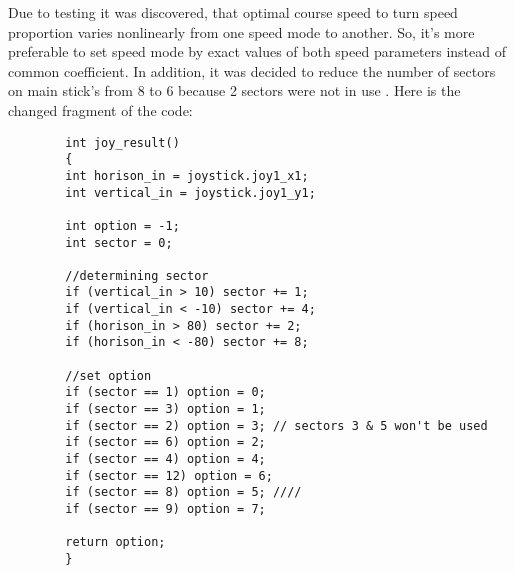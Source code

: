 \begin{enumerate*}
{\begin{verbatim}
	    	\end{verbatim} 
	    }
	    \item Due to testing it was discovered, that optimal course speed to turn speed proportion varies nonlinearly from one speed mode to another. So, it's more preferable to set speed mode by exact values of both speed parameters instead of common coefficient. In addition, it was decided to reduce the number of sectors on main stick's from 8 to 6 because 2 sectors were not in use %
	    .\newline
	    Here is the changed fragment of the code: \newline
	    {\small
	    \begin{verbatim}
  	    int joy_result()
  	    {
  		int horison_in = joystick.joy1_x1;
  		int vertical_in = joystick.joy1_y1;
  		
  		int option = -1;
  		int sector = 0;
  		
  		//determining sector
  		if (vertical_in > 10) sector += 1;
  		if (vertical_in < -10) sector += 4;
  		if (horison_in > 80) sector += 2;
  		if (horison_in < -80) sector += 8;
  		
  		//set option
  		if (sector == 1) option = 0;
  		if (sector == 3) option = 1;
  		if (sector == 2) option = 3; // sectors 3 & 5 won't be used
  		if (sector == 6) option = 2;
  		if (sector == 4) option = 4;
  		if (sector == 12) option = 6;
  		if (sector == 8) option = 5; ////
  		if (sector == 9) option = 7;
  		
  		return option;
  	    }
        \end{verbatim} 
        }
  \end{enumerate*}
\fillpage
